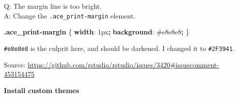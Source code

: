 \documentclass[
  a4paper,
  twoside,
  openright]{book}
\newenvironment{Shaded}{\begin{snugshade}}{\end{snugshade}}
\newcommand{\CharTok}[1]{\textcolor[rgb]{0.31,0.60,0.02}{#1}}
\newcommand{\ConstantTok}[1]{\textcolor[rgb]{0.56,0.35,0.01}{#1}}
\newcommand{\DataTypeTok}[1]{\textcolor[rgb]{0.13,0.29,0.53}{#1}}
\newcommand{\DecValTok}[1]{\textcolor[rgb]{0.00,0.00,0.81}{#1}}
\newcommand{\FunctionTok}[1]{\textcolor[rgb]{0.13,0.29,0.53}{\textbf{#1}}}
\newcommand{\KeywordTok}[1]{\textcolor[rgb]{0.13,0.29,0.53}{\textbf{#1}}}
\newcommand{\NormalTok}[1]{#1}
\newcommand{\OperatorTok}[1]{\textcolor[rgb]{0.81,0.36,0.00}{\textbf{#1}}}
\theoremstyle{definition}
\theoremstyle{definition}
\theoremstyle{definition}
\theoremstyle{definition}
\theoremstyle{remark}
\begin{document}
Q: The margin line is too bright.\\
A: Change the \texttt{.ace\_print-margin} element.

\begin{Shaded}
\begin{Highlighting}[]
\FunctionTok{.ace\_print{-}margin}\NormalTok{ \{}
  \KeywordTok{width}\CharTok{:} \DecValTok{1}\DataTypeTok{px}\OperatorTok{;}
  \KeywordTok{background}\CharTok{:} \ConstantTok{\#e8e8e8}\OperatorTok{;}
\NormalTok{\}}
\end{Highlighting}
\end{Shaded}

\texttt{\#e8e8e8} is the culprit here, and should be darkened. I changed it to \texttt{\#2F3941}.

Source: \url{https://github.com/rstudio/rstudio/issues/3420\#issuecomment-453154475}

\textbf{Install custom themes}
\end{document}
